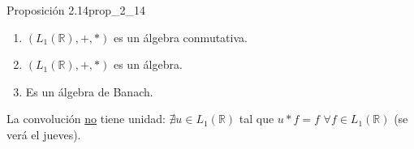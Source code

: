 \begin{proposicion}{Proposición 2.14}{prop_2_14}
\begin{enumerate}
\item[(1)] $(L_1(\mathbb{R}), +, *)$ es un álgebra conmutativa.
\item[(2)--(4)] $(L_1(\mathbb{R}), +, *)$ es un álgebra.
\item[(5)] Es un álgebra de Banach.
\end{enumerate}
La convolución \underline{no} tiene unidad: $\nexists u \in L_1(\mathbb{R})$ tal que $u * f = f$ $\forall f \in L_1(\mathbb{R})$ (se verá el jueves).
\end{proposicion}
